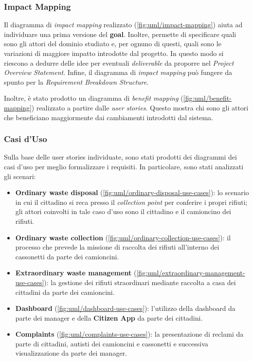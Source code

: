 \subsubsection{Impact Mapping}
Il diagramma di \textit{impact mapping} realizzato (\ref{fig:uml/impact-mapping}) aiuta ad individuare una prima versione del \textbf{goal}. Inoltre, permette di specificare quali sono gli attori del dominio studiato e, per ognuno di questi, quali sono le variazioni di maggiore impatto introdotte dal progetto. In questo modo si riescono a dedurre delle idee per eventuali \textit{deliverable} da proporre nel \textit{Project Overview Statement}. Infine, il diagramma di \textit{impact mapping} può fungere da spunto per la \textit{Requirement Breakdown Structure}.

Inoltre, è stato prodotto un diagramma di \textit{benefit mapping} (\ref{fig:uml/benefit-mapping}) realizzato a partire dalle \textit{user stories}. Questo mostra chi sono gli attori che beneficiano maggiormente dai cambiamenti introdotti dal sistema.

\subsubsection{Casi d'Uso}
Sulla base delle user stories individuate, sono stati prodotti dei diagrammi dei casi d'uso per meglio formalizzare i requisiti. In particolare, sono stati analizzati gli scenari:
\begin{itemize}
    \item \textbf{Ordinary waste disposal} (\ref{fig:uml/ordinary-disposal-use-cases}): lo scenario in cui il cittadino si reca presso il \textit{collection point} per conferire i propri rifiuti; gli attori coinvolti in tale caso d'uso sono il cittadino e il camioncino dei rifiuti.
    \item \textbf{Ordinary waste collection} (\ref{fig:uml/ordinary-collection-use-cases}): il processo che prevede la missione di raccolta dei rifiuti all'interno dei cassonetti da parte dei camioncini.
    \item \textbf{Extraordinary waste management} (\ref{fig:uml/extraordinary-management-use-cases}): la gestione dei rifiuti straordinari mediante raccolta a casa dei cittadini da parte dei camioncini.
    \item \textbf{Dashboard} (\ref{fig:uml/dashboard-use-cases}): l'utilizzo della dashboard da parte dei manager e della \textbf{Citizen App} da parte dei cittadini.
    \item \textbf{Complaints} (\ref{fig:uml/complaints-use-cases}): la presentazione di reclami da parte di cittadini, autisti dei camioncini e cassonetti e successiva visualizzazione da parte dei manager.
\end{itemize}

